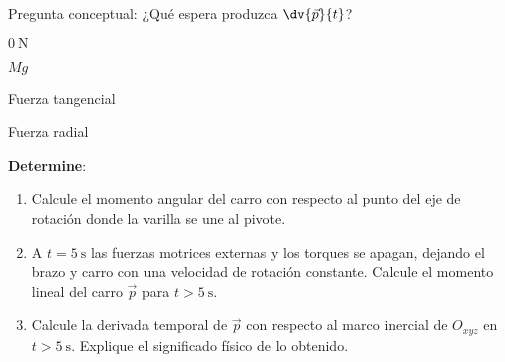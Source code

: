 \documentclass[11pt, spanish, a4paper, twoside]{article}
\begin{document}
\begin{enumerate}
Pregunta conceptual:
¿Qué espera produzca $\dv{\vec{p}}{t}$?
\begin{enumerate*}[label=\alph*),itemjoin={,\quad}]
	\item $\SI{0}{\newton}$
	\item $M g$
	\item Fuerza tangencial
	\item Fuerza radial
\end{enumerate*}

\textbf{Determine}:
\begin{enumerate}[label=\alph*)]
	\item Calcule el momento angular del carro con respecto al punto del eje de rotación donde la varilla se une al pivote.
	\item A $t= \SI{5}{\second}$ las fuerzas motrices externas y los torques se apagan, dejando el brazo y carro con una velocidad de rotación constante.
	Calcule el momento lineal del carro $\vec{p}$ para $t>\SI{5}{\second}$.
	\item Calcule la derivada temporal de $\vec{p}$ con respecto al marco inercial de $O_{xyz}$ en $t> \SI{5}{\second}$.
	Explique el significado físico de lo obtenido.
\end{enumerate}


\end{enumerate}
\end{document}
